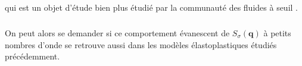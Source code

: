 \noindent qui est un objet d'étude bien plus étudié par la communauté des fluides à seuil \cite{chowdhury_long_2016, maier_emergence_2017, lerner_simple_2020}.

\subparagraph{}On peut alors se demander si ce comportement évanescent de $S_\sigma(\mathbf{q})$ à petits nombres d'onde se retrouve aussi dans les modèles élastoplastiques étudiés précédemment.

%
%
%
%
%
%
